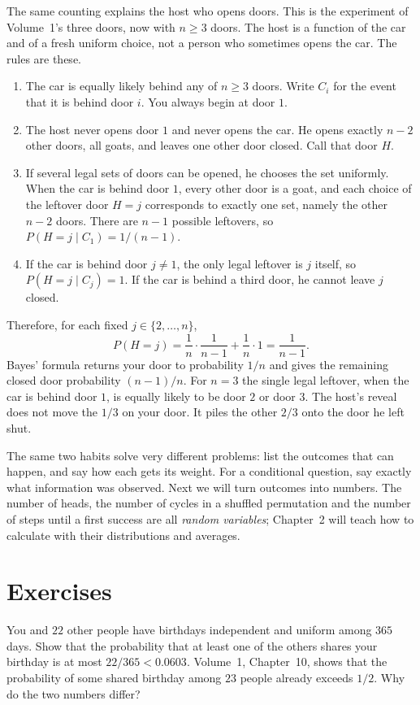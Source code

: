 The same counting explains the host who opens doors. This is the experiment of Volume~1's three doors, now with $n\ge3$ doors. The host is a function of the car and of a fresh uniform choice, not a person who sometimes opens the car. The rules are these.
\begin{enumerate}
\item The car is equally likely behind any of $n\ge3$ doors. Write $C_i$ for the event that it is behind door $i$. You always begin at door $1$.
\item The host never opens door $1$ and never opens the car. He opens exactly $n-2$ other doors, all goats, and leaves one other door closed. Call that door $H$.
\item If several legal sets of doors can be opened, he chooses the set uniformly. When the car is behind door $1$, every other door is a goat, and each choice of the leftover door $H=j$ corresponds to exactly one set, namely the other $n-2$ doors. There are $n-1$ possible leftovers, so $P(H=j\mid C_1)=1/(n-1)$.
\item If the car is behind door $j\neq1$, the only legal leftover is $j$ itself, so $P(H=j\mid C_j)=1$. If the car is behind a third door, he cannot leave $j$ closed.
\end{enumerate}
Therefore, for each fixed $j\in\{2,\ldots,n\}$,
\[
 P(H=j)=\frac1n\cdot\frac1{n-1}+\frac1n\cdot1=\frac1{n-1}.
\]
Bayes' formula returns your door to probability $1/n$ and gives the remaining closed door probability $(n-1)/n$. For $n=3$ the single legal leftover, when the car is behind door $1$, is equally likely to be door $2$ or door $3$. The host's reveal does not move the $1/3$ on your door. It piles the other $2/3$ onto the door he left shut.

The same two habits solve very different problems: list the outcomes that can happen, and say how each gets its weight. For a conditional question, say exactly what information was observed. Next we will turn outcomes into numbers. The number of heads, the number of cycles in a shuffled permutation and the number of steps until a first success are all \emph{random variables}; Chapter~2 will teach how to calculate with their distributions and averages.

\section{Exercises}

\begin{exercise}[$\star$]\label{ex:mybirthday}
You and $22$ other people have birthdays independent and uniform among $365$ days. Show that the probability that at least one of the others shares your birthday is at most $22/365<0.0603$. Volume~1, Chapter~10, shows that the probability of some shared birthday among $23$ people already exceeds $1/2$. Why do the two numbers differ?
\end{exercise}


